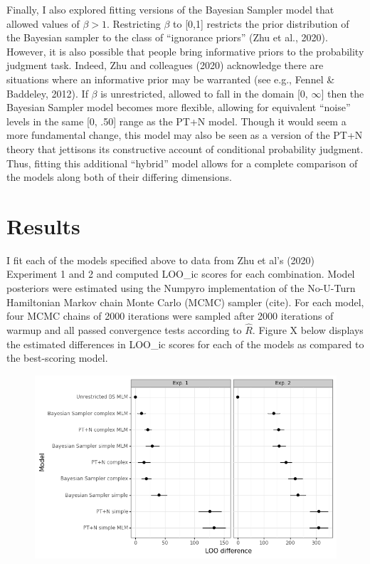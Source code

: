 \documentclass{article}
\begin{document}
Finally, I also explored fitting versions of the Bayesian Sampler model
that allowed values of \(\beta > 1\). Restricting \(\beta\) to {[}0,1{]}
restricts the prior distribution of the Bayesian sampler to the class of
``ignorance priors'' (Zhu et al., 2020). However, it is also possible
that people bring informative priors to the probability judgment task.
Indeed, Zhu and colleagues (2020) acknowledge there are situations where
an informative prior may be warranted (see e.g., Fennel \& Baddeley,
2012). If \(\beta\) is unrestricted, allowed to fall in the domain {[}0,
\(\infty\){]} then the Bayesian Sampler model becomes more flexible,
allowing for equivalent ``noise'' levels in the same {[}0, .50{]} range
as the PT+N model. Though it would seem a more fundamental change, this
model may also be seen as a version of the PT+N theory that jettisons
its constructive account of conditional probability judgment. Thus,
fitting this additional ``hybrid'' model allows for a complete
comparison of the models along both of their differing dimensions.

\hypertarget{results}{%
\section{Results}\label{results}}

I fit each of the models specified above to data from Zhu et al's (2020)
Experiment 1 and 2 and computed LOO\_ic scores for each combination.
Model posteriors were estimated using the Numpyro implementation of the
No-U-Turn Hamiltonian Markov chain Monte Carlo (MCMC) sampler (cite).
For each model, four MCMC chains of 2000 iterations were sampled after
2000 iterations of warmup and all passed convergence tests according to
\(\hat{R}\). Figure X below displays the estimated differences in
LOO\_ic scores for each of the models as compared to the best-scoring
model.

\begin{figure}[ht]
\centering
\includegraphics[width=5in]{plot_compare.png}
\end{figure}
\end{document}
